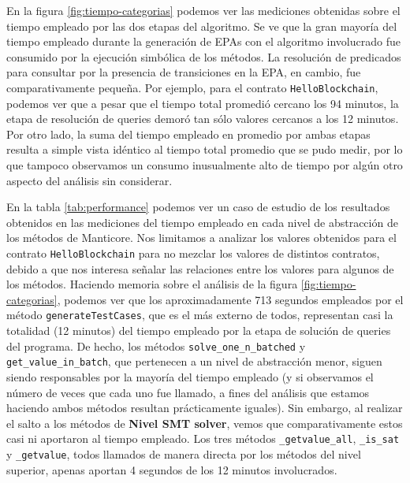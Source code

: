 En la figura \ref{fig:tiempo-categorias} podemos ver las mediciones obtenidas sobre el tiempo empleado por las dos etapas del algoritmo.
Se ve que la gran mayoría del tiempo empleado durante la generación de EPAs con el algoritmo involucrado fue consumido por la ejecución simbólica de los métodos.
La resolución de predicados para consultar por la presencia de transiciones en la EPA, en cambio, fue comparativamente pequeña.
Por ejemplo, para el contrato \texttt{HelloBlockchain}, podemos ver que a pesar que el tiempo total promedió cercano los 94 minutos, la etapa de resolución de queries demoró tan sólo valores cercanos a los 12 minutos.
Por otro lado, la suma del tiempo empleado en promedio por ambas etapas resulta a simple vista idéntico al tiempo total promedio que se pudo medir, por lo que tampoco observamos un consumo inusualmente alto de tiempo por algún otro aspecto del análisis sin considerar.

En la tabla \ref{tab:performance} podemos ver un caso de estudio de los resultados obtenidos en las mediciones del tiempo empleado en cada nivel de abstracción de los métodos de Manticore.
Nos limitamos a analizar los valores obtenidos para el contrato \texttt{HelloBlockchain} para no mezclar los valores de distintos contratos, debido a que nos interesa señalar las relaciones entre los valores para algunos de los métodos.
Haciendo memoria sobre el análisis de la figura \ref{fig:tiempo-categorias}, podemos ver que los aproximadamente 713 segundos empleados por el método \texttt{generateTestCases}, que es el más externo de todos, representan casi la totalidad (12 minutos) del tiempo empleado por la etapa de solución de queries del programa.
De hecho, los métodos \texttt{solve\_one\_n\_batched} y \texttt{get\_value\_in\_batch}, que pertenecen a un nivel de abstracción menor, siguen siendo responsables por la mayoría del tiempo empleado (y si observamos el número de veces que cada uno fue llamado, a fines del análisis que estamos haciendo ambos métodos resultan prácticamente iguales).
Sin embargo, al realizar el salto a los métodos de \textbf{Nivel SMT solver}, vemos que comparativamente estos casi ni aportaron al tiempo empleado.
Los tres métodos \texttt{\_getvalue\_all}, \texttt{\_is\_sat} y \texttt{\_getvalue}, todos llamados de manera directa por los métodos del nivel superior, apenas aportan 4 segundos de los 12 minutos involucrados.

